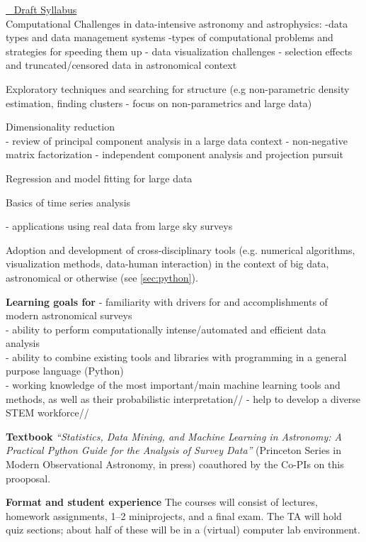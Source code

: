 \item \underline{\astrocl~ Draft Syllabus}\\
Computational Challenges in data-intensive astronomy and astrophysics:
-data types and data management systems
-types of computational problems and strategies for speeding them up 
- data visualization challenges
- selection effects and truncated/censored data in astronomical context 

Exploratory techniques and searching for structure (e.g non-parametric density estimation, finding clusters - focus on non-parametrics and large data)

Dimensionality reduction\\
- review of principal component analysis in a large data context
- non-negative matrix factorization 
- independent component analysis and projection pursuit 

Regression and model fitting for large data

Basics of time series analysis

- applications using real data from large sky surveys

Adoption and development of cross-disciplinary tools (e.g. numerical 
algorithms, visualization methods, data-human interaction) in the context
of big data, astronomical or otherwise (see \ref{sec:python}).
\eit

{\bf Learning goals for \astrocl}
- familiarity with drivers for and accomplishments of modern astronomical surveys\\
- ability to perform computationally intense/automated and efficient data analysis\\
- ability to combine existing tools and libraries with programming in a general purpose language (Python)\\
- working knowledge of the most important/main machine learning tools and
   methods, as well as their probabilistic interpretation// 
- help to develop a diverse STEM workforce//
 


{\bf Textbook} {\it ``Statistics, Data Mining, and Machine Learning in
  Astronomy: A Practical Python Guide for the Analysis of Survey
  Data''} (Princeton Series in Modern Observational Astronomy, in
press) coauthored by the Co-PIs on this prooposal.

{\bf Format and student experience} 
The courses will consist of lectures, homework assignments, 1--2
miniprojects, and a final exam. The TA will hold quiz sections; about
half of these will be in a (virtual) computer lab environment. 

